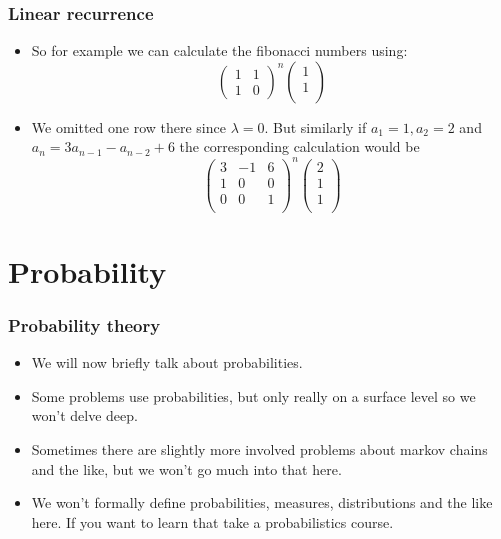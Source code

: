 \documentclass{beamer}
\newcommand\p[1]{\left(#1\right)}
\begin{document}
\begin{frame}[plain]
\frametitle{Linear recurrence}

\begin{itemize}

\item So for example we can calculate the fibonacci numbers using:
\[\p{\begin{matrix}1 & 1\\1 & 0\end{matrix}}^n\p{\begin{matrix}1\\1\\\end{matrix}}\]

\item We omitted one row there since $\lambda = 0$. But similarly if $a_1 = 1, a_2 = 2$ and $a_n = 3a_{n-1} - a_{n - 2} + 6$ the corresponding calculation would be
\[\p{\begin{matrix}3 & -1 & 6\\1 & 0 & 0\\0 & 0 & 1\\\end{matrix}}^n\p{\begin{matrix}2\\1\\1\\\end{matrix}}\]

\end{itemize}

\end{frame}

\section*{Probability}
\begin{frame}[plain]
\frametitle{Probability theory}

\begin{itemize}

\item We will now briefly talk about probabilities.

\item Some problems use probabilities, but only really on a surface level so we won't delve deep.

\item Sometimes there are slightly more involved problems about markov chains and the like, but we won't go much into that here.

\item We won't formally define probabilities, measures, distributions and the like here. If you want to learn that take a probabilistics course.

\end{itemize}

\end{frame}
\end{document}

